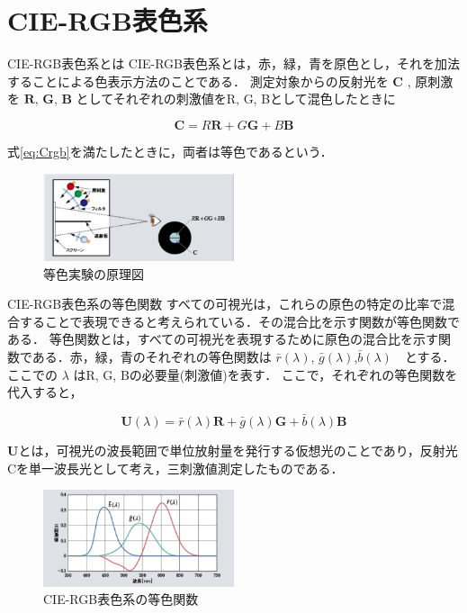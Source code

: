 \documentclass[8pt, jfont=ipaexm, t]{beamer} %
\begin{document}
\section{CIE-RGB表色系}
\begin{frame}{CIE-RGB表色系とは}
CIE-RGB表色系とは，赤，緑，青を原色とし，それを加法することによる色表示方法のことである．
測定対象からの反射光を \(\textbf{C}\) , 原刺激を \(\textbf{R, G, B}\)
としてそれぞれの刺激値をR, G, Bとして混色したときに

\begin{equation} \label{eq:Crgb}
\textbf{C} = R\textbf{R} + G\textbf{G} + B\textbf{B}
\end{equation}

式\eqref{eq:Crgb}を満たしたときに，両者は等色であるという．

\begin{figure}[h]
  \centering
  \includegraphics[width=0.5\textwidth]{./figure/022.png}
  \caption{等色実験の原理図}
\end{figure}
\end{frame}

\begin{frame}{CIE-RGB表色系の等色関数}
すべての可視光は，これらの原色の特定の比率で混合することで表現できると考えられている．その混合比を示す関数が等色関数である．
等色関数とは，すべての可視光を表現するために原色の混合比を示す関数である．赤，緑，青のそれぞれの等色関数は \(\bar{r}(\lambda)\), \(\bar{g}(\lambda)\),\(\bar{b}(\lambda)\)　とする．ここでの \(\lambda\) はR, G, Bの必要量(刺激値)を表す． ここで，それぞれの等色関数を代入すると，

\begin{equation}\label{eq:cie-rgb}
\textbf{U}(\lambda) = \bar{r}(\lambda)\textbf{R} + \bar{g}(\lambda)\textbf{G} + \bar{b}(\lambda)\textbf{B}
\end{equation}

\(\textbf{U}\)とは，可視光の波長範囲で単位放射量を発行する仮想光のことであり，反射光Cを単一波長光として考え，三刺激値測定したものである．
\begin{figure}
  \centering
  \includegraphics[width=0.5\textwidth]{./figure/023.png}
  \caption{CIE-RGB表色系の等色関数}
  \label{fig:cie-rgb02}
\end{figure}
\end{frame}
\end{document}
